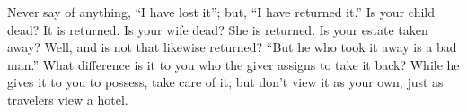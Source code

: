 Never say of anything, ``I have lost it''; but, ``I have returned it.'' Is your
child dead? It is returned. Is your  wife dead? She is returned. Is your estate
taken away? Well, and is not that  likewise returned? ``But he who took it away
is a bad man.''  What difference is it to you who the  giver assigns to take it
back? While he gives  it to you to possess, take care of  it; but don't view it
as your own, just as travelers view a hotel.
